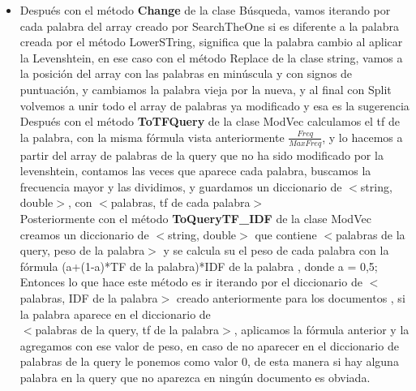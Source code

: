\documentclass[12pt, a4paper]{article}
\begin{document}
\begin{enumerate}
\begin{itemize}
\begin{itemize}
                        \end{itemize}
                  \item Después con el método \textbf{Change} de la clase Búsqueda,
                        vamos iterando por cada palabra del array creado por SearchTheOne si es diferente
                        a la palabra creada por el método LowerSTring, significa que la palabra
                        cambio al aplicar la Levenshtein, en ese caso con el método Replace de la clase
                        string, vamos a la posición del array con las palabras en minúscula y
                        con signos de puntuación, y cambiamos la palabra vieja por la nueva, y al final
                        con Split volvemos a unir todo el array de palabras ya modificado y esa es la
                        sugerencia\\
                        Después con el método \textbf{ToTFQuery} de la clase ModVec calculamos el
                        tf de la palabra, con la misma fórmula vista anteriormente $\frac{Freq}{MaxFreq}$,
                        y lo hacemos a partir del array de palabras de la query que no ha
                        sido modificado por la levenshtein, contamos las veces que aparece
                        cada palabra, buscamos la frecuencia mayor y las dividimos,
                        y guardamos un diccionario de $<$string, double$>$,
                        con $<$palabras, tf de cada palabra$>$\\
                        Posteriormente con el método \textbf{ToQueryTF\_IDF} de la clase ModVec
                        creamos un diccionario de $<$string, double$>$ que contiene
                        $<$palabras de la query, peso de la palabra$>$ y se calcula su el peso de
                        cada palabra con la fórmula
                        (a+(1-a)*TF de la palabra)*IDF de la palabra , donde a = 0,5;\\
                        Entonces lo que hace este método es ir iterando por el diccionario de
                        $<$palabras, IDF de la palabra$>$ creado anteriormente para los documentos ,
                        si la palabra aparece en el diccionario de\\
                        $<$palabras de la query, tf de la palabra$>$,
                        aplicamos la fórmula anterior y la agregamos con ese valor de peso, en caso de no aparecer
                        en el diccionario de palabras de la query le ponemos como valor 0, de esta manera
                        si hay alguna palabra en la query que no aparezca en ningún documento es obviada.\\

\end{itemize}
\end{enumerate}
\end{document}
